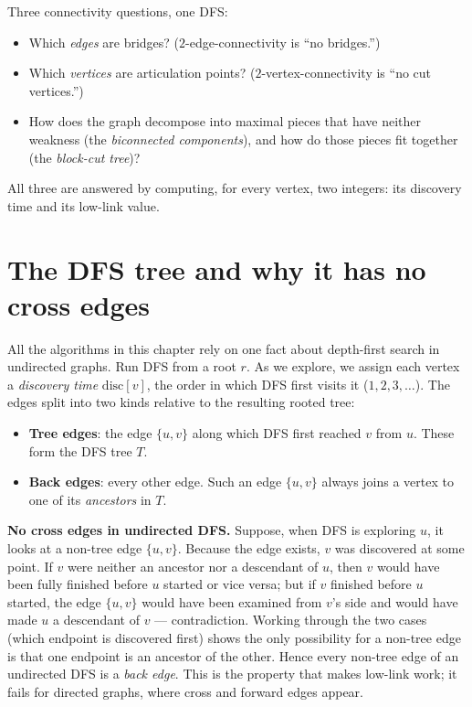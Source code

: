 \begin{focusbox}
Three connectivity questions, one DFS:
\begin{itemize}
  \item Which \emph{edges} are bridges? ($2$-edge-connectivity is ``no bridges.'')
  \item Which \emph{vertices} are articulation points? ($2$-vertex-connectivity is
        ``no cut vertices.'')
  \item How does the graph decompose into maximal pieces that have neither weakness
        (the \emph{biconnected components}), and how do those pieces fit together (the
        \emph{block-cut tree})?
\end{itemize}
All three are answered by computing, for every vertex, two integers: its discovery
time and its low-link value.
\end{focusbox}

\section{The DFS tree and why it has no cross edges}
\label{ch10:dfstree}

All the algorithms in this chapter rely on one fact about depth-first search in undirected graphs.
Run DFS from a root $r$. As we explore, we assign each vertex a \emph{discovery time}
$\mathrm{disc}[v]$, the order in which DFS first visits it ($1,2,3,\dots$). The edges
split into two kinds relative to the resulting rooted tree:

\begin{itemize}
  \item \textbf{Tree edges}: the edge $\{u,v\}$ along which DFS first reached $v$ from
        $u$. These form the DFS tree $T$.
  \item \textbf{Back edges}: every other edge. Such an edge $\{u,v\}$ always joins a
        vertex to one of its \emph{ancestors} in $T$.
\end{itemize}

\begin{whybox}
\textbf{No cross edges in undirected DFS.} Suppose, when DFS is exploring $u$, it looks
at a non-tree edge $\{u,v\}$. Because the edge exists, $v$ was discovered at some
point. If $v$ were neither an ancestor nor a descendant of $u$, then $v$ would have
been fully finished before $u$ started or vice versa; but if $v$ finished before $u$
started, the edge $\{u,v\}$ would have been examined from $v$'s side and would have
made $u$ a descendant of $v$ --- contradiction. Working through the two cases (which
endpoint is discovered first) shows the only possibility for a non-tree edge is that
one endpoint is an ancestor of the other. Hence every non-tree edge of an undirected
DFS is a \emph{back edge}. This is the property that makes low-link work; it fails for
directed graphs, where cross and forward edges appear.
\end{whybox}

